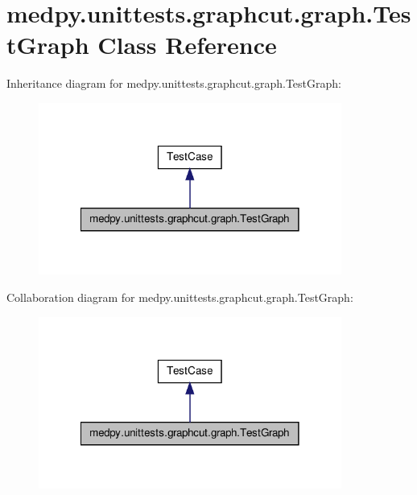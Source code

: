 \hypertarget{classmedpy_1_1unittests_1_1graphcut_1_1graph_1_1TestGraph}{
\section{medpy.unittests.graphcut.graph.TestGraph Class Reference}
\label{classmedpy_1_1unittests_1_1graphcut_1_1graph_1_1TestGraph}
}


Inheritance diagram for medpy.unittests.graphcut.graph.TestGraph:\nopagebreak
\begin{figure}[H]
\begin{center}
\leavevmode
\includegraphics[width=282pt]{classmedpy_1_1unittests_1_1graphcut_1_1graph_1_1TestGraph__inherit__graph}
\end{center}
\end{figure}


Collaboration diagram for medpy.unittests.graphcut.graph.TestGraph:\nopagebreak
\begin{figure}[H]
\begin{center}
\leavevmode
\includegraphics[width=282pt]{classmedpy_1_1unittests_1_1graphcut_1_1graph_1_1TestGraph__coll__graph}
\end{center}
\end{figure}

